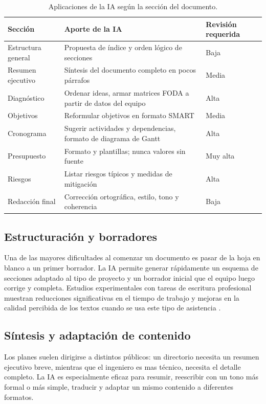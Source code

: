 \documentclass[runningheads]{llncs}
\begin{document}
\begin{table}
\caption{Aplicaciones de la IA según la sección del documento.}\label{tab:aplicaciones}
\centering
\begin{tabular}{|p{3.2cm}|p{5.3cm}|p{2.2cm}|}
\hline
\textbf{Sección} & \textbf{Aporte de la IA} & \textbf{Revisión requerida}\\
\hline
Estructura general & Propuesta de índice y orden lógico de secciones & Baja\\
Resumen ejecutivo & Síntesis del documento completo en pocos párrafos & Media\\
Diagnóstico & Ordenar ideas, armar matrices FODA a partir de datos del equipo & Alta\\
Objetivos & Reformular objetivos en formato SMART & Media\\
Cronograma & Sugerir actividades y dependencias, formato de diagrama de Gantt & Alta\\
Presupuesto & Formato y plantillas; nunca valores sin fuente & Muy alta\\
Riesgos & Listar riesgos típicos y medidas de mitigación & Alta\\
Redacción final & Corrección ortográfica, estilo, tono y coherencia & Baja\\
\hline
\end{tabular}
\end{table}

\subsection{Estructuración y borradores}

Una de las mayores dificultades al comenzar un documento es pasar de la hoja en blanco a un primer borrador. La IA permite generar rápidamente un esquema de secciones adaptado al tipo de proyecto y un borrador inicial que el equipo luego corrige y completa. Estudios experimentales con tareas de escritura profesional muestran reducciones significativas en el tiempo de trabajo y mejoras en la calidad percibida de los textos cuando se usa este tipo de asistencia \cite{noy2023}.

\subsection{Síntesis y adaptación de contenido}

Los planes suelen dirigirse a distintos públicos: un directorio necesita un resumen ejecutivo breve, mientras que el ingeniero es mas técnico, necesita el detalle completo. La IA es especialmente eficaz para resumir, reescribir con un tono más formal o más simple, traducir y adaptar un mismo contenido a diferentes formatos.
\end{document}
